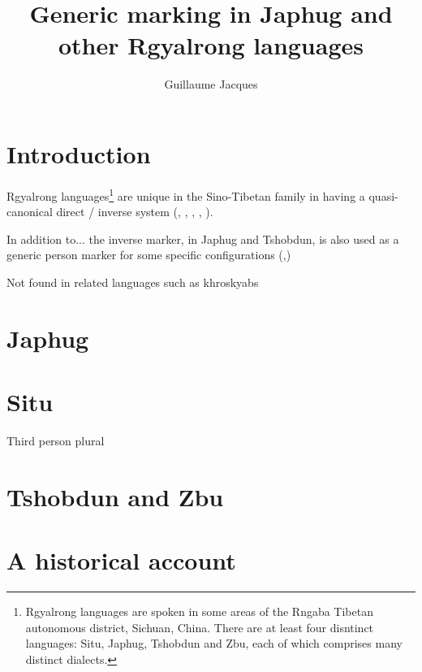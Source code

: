 \documentclass[oldfontcommands,oneside,a4paper,11pt]{article}
\begin{document}
 
\linenumbers
\title{Generic marking in Japhug and other Rgyalrong languages }
\author{Guillaume Jacques}
\maketitle

 
\section{Introduction}
Rgyalrong languages\footnote{Rgyalrong languages are spoken in some areas of the Rngaba Tibetan autonomous district, Sichuan, China. There are at least four disntinct languages: Situ, Japhug, Tshobdun and Zbu, each of which comprises many distinct dialects.} are unique in the Sino-Tibetan family in having a quasi-canonical direct / inverse system (\citealt{delancey81direction}, \citealt{jackson02rentongdengdi}, \citealt{jacques10inverse}, \citealt{gongxun14agreement}, \citealt{jacques14inverse}). 

In addition to... the inverse marker, in Japhug and Tshobdun, is also used as a generic person marker for some specific configurations (\citealt{jacques12demotion},\citealt{sun14generic})

 Not found in related languages such as khroskyabs \citet{lai13affixale}
 
 
\section{Japhug}
\citet{jacques12demotion} \citet{jacques10inverse}
\section{Situ}
\citet{linxr93jiarong}
\citet[163]{lin09phd}

Third person plural

\citet[101-102]{jacques12agreement}
\section{Tshobdun and Zbu}
\citet{sun14generic}
\section{A historical account}




\end{document}
